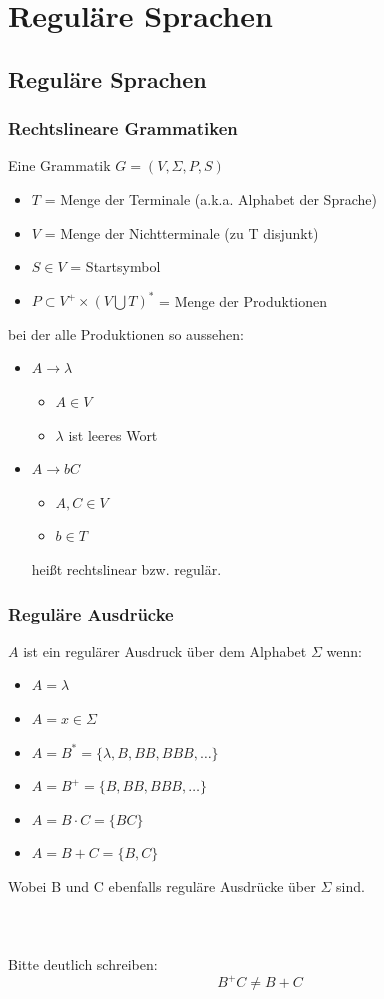\section{Reguläre Sprachen}
\subsection{Reguläre Sprachen}
\begin{frame}
\frametitle{Rechtslineare Grammatiken}
Eine Grammatik $G = ( V, \Sigma, P, S)$
\begin{itemize}
	\item $T$ = Menge der Terminale (a.k.a. Alphabet der Sprache)
	\item $V$ = Menge der Nichtterminale (zu T disjunkt)
	\item $S \in V$ = Startsymbol
	\item $P \subset V^{+} \times (V \bigcup T)^{*}$ = Menge der Produktionen
\end{itemize}
bei der alle Produktionen so aussehen:
\begin{itemize}
	\item $A \rightarrow \lambda$
	\begin{itemize}
		\item $A \in V$
		\item $\lambda$ ist leeres Wort
	\end{itemize}
	\item $A \rightarrow bC$
	\begin{itemize}
		\item $A, C \in V$
		\item $b \in T$
	\end{itemize}
heißt rechtslinear bzw. regulär. 
\end{itemize}
\end{frame}

\begin{frame}
\frametitle{Reguläre Ausdrücke}
$A$ ist ein regulärer Ausdruck über dem Alphabet $\Sigma$ wenn:
\begin{itemize}
	\item $A = \lambda$
	\item $A = x \in \Sigma$
	\item $A = B^{*} = \{\lambda, B, BB, BBB, \ldots\}$
	\item $A = B^{+} = \{B, BB, BBB, \ldots\}$
	\item $A = B \cdot C = \{BC\}$
	\item $A = B + C = \{B, C\}$
\end{itemize}
Wobei B und C ebenfalls reguläre Ausdrücke über $\Sigma$ sind.
~\\~\\~\\~\\

Bitte deutlich schreiben:
\begin{equation*}
B^{+}C \neq B + C
\end{equation*}
\end{frame}

